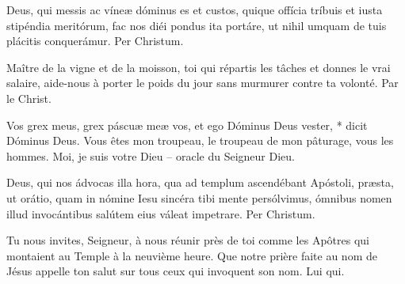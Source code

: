 \documentclass[Session2025.tex]{subfiles}
\begin{document}
{

Deus, qui messis ac víneæ dóminus es et custos,
quique offícia tríbuis et iusta stipéndia meritórum, fac
nos diéi pondus ita portáre, ut nihil umquam de tuis
plácitis conquerámur. Per Christum.

Maître de la vigne et de la
moisson, toi qui répartis
les tâches et donnes le vrai salaire,
aide-nous à porter le poids
du jour sans murmurer contre ta
volonté. Par le Christ.





\needspace{3cm}

{Vos grex meus, grex páscuæ meæ vos, et ego Dóminus Deus vester, *
dicit Dóminus Deus.}
{Vous êtes mon troupeau, le troupeau de mon pâturage, vous les hommes.
Moi, je suis votre Dieu – oracle du Seigneur Dieu.}


Deus, qui nos ádvocas illa hora, qua ad templum
ascendébant Apóstoli, præsta, ut orátio, quam in nómine
Iesu sincéra tibi mente persólvimus, ómnibus
nomen illud invocántibus salútem eius váleat impetrare.
Per Christum.

Tu nous invites, Seigneur,
à nous réunir près de toi
comme les Apôtres qui montaient
au Temple à la neuvième
heure. Que notre prière faite au
nom de Jésus appelle ton salut
sur tous ceux qui invoquent son
nom. Lui qui.




}
\end{document}
